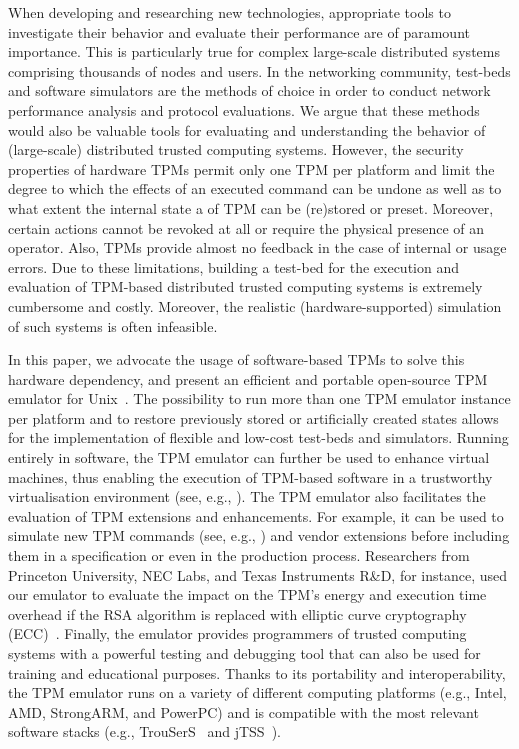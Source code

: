 \documentclass[runningheads]{llncs}
\begin{document}
When developing and researching new technologies, appropriate tools to
investigate their behavior and evaluate their performance are of paramount
importance. This is particularly true for complex large-scale distributed
systems comprising thousands of nodes and users.
In the networking community, test-beds and software simulators are the methods
of choice in order to conduct network performance analysis and protocol
evaluations. We argue that these methods would also be valuable tools for
evaluating and understanding the behavior of (large-scale) distributed trusted
computing systems. However, the security properties of hardware TPMs permit
only one TPM per platform and limit the degree to which the effects of an
executed command can be undone as well as to what extent the internal state
a of TPM can be (re)stored or preset. Moreover, certain actions cannot be
revoked at all or require the physical presence of an operator. Also, TPMs
provide almost no feedback in the case of internal or usage errors. Due to
these limitations, building a test-bed for the execution and evaluation of
TPM-based distributed trusted computing systems is extremely cumbersome and
costly. Moreover, the realistic (hardware-supported) simulation of such
systems is often infeasible.

In this paper, we advocate the usage of software-based TPMs to
solve this hardware dependency, and present an efficient and portable
open-source TPM emulator for Unix~\cite{TPMEmu}. The possibility to run
more than one TPM emulator instance per platform and to restore previously
stored or artificially created states allows for the implementation of
flexible and low-cost test-beds and simulators. Running entirely in software,
the TPM emulator can further be used to enhance virtual machines, thus
enabling the execution of TPM-based software in a trustworthy virtualisation
environment (see, e.g., \cite{Xen}).
The TPM emulator also facilitates the evaluation of TPM extensions and
enhancements. For example, it can be used to simulate new TPM commands
(see, e.g., \cite{Sarmenta}) and vendor extensions before including them
in a specification or even in the production process.
Researchers from Princeton University, NEC Labs, and Texas Instruments R\&D,
for instance, used our emulator to evaluate the impact on the TPM's energy
and execution time overhead if the RSA algorithm is replaced with elliptic
curve cryptography (ECC)~\cite{Aaraj}. Finally, the emulator provides
programmers of trusted computing systems with a powerful testing and
debugging tool that can also be used for training and educational purposes.
Thanks to its portability and interoperability, the TPM emulator runs on a
variety of different computing platforms (e.g., Intel, AMD, StrongARM, and
PowerPC) and is compatible with the most relevant software stacks (e.g.,
TrouSerS~\cite{trousers} and jTSS~\cite{jTSS}).
\end{document}
